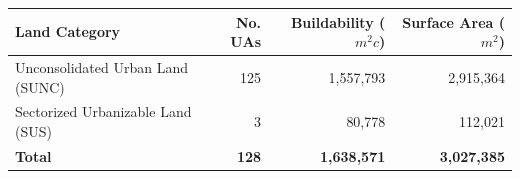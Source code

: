 \begin{tabular}{lrrr}
  \toprule
  \textbf{Land Category} & \textbf{No. UAs} & \textbf{Buildability ($m^2c$)} & \textbf{Surface Area ($m^2$)} \\
  \midrule
  Unconsolidated Urban Land (SUNC) & 125 & 1,557,793 & 2,915,364 \\
  Sectorized Urbanizable Land (SUS) & 3 & 80,778 & 112,021 \\
  \midrule
  \textbf{Total} & \textbf{128} & \textbf{1,638,571} & \textbf{3,027,385} \\
  \bottomrule
\end{tabular}
